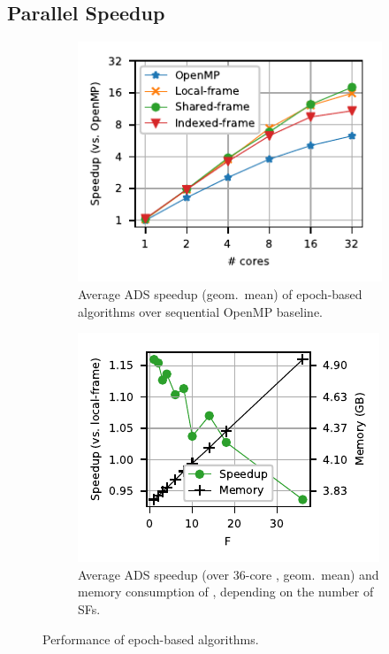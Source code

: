 \subsection{Parallel Speedup}
%
\begin{figure}[t]
\centering
\begin{subfigure}[t]{.48\textwidth}
\centering
\includegraphics{sources/plots/betw-apx/parallel-speedup.pdf}
\caption{Average ADS speedup (geom.\ mean) of epoch-based
algorithms over sequential OpenMP baseline.}
\label{fig:betw-apx:parallel-speedup}
\end{subfigure}\hfill
\begin{subfigure}[t]{.48\textwidth}
\centering
\includegraphics{sources/plots/betw-apx/time-memory.pdf}
\caption{Average ADS speedup (over 36-core \localframe, geom.\ mean)
and memory consumption of \sharedframe, depending on the number
of SFs.}
\label{fig:betw-apx:time-memory}
\end{subfigure}
\caption{Performance of epoch-based algorithms.}
\end{figure}

